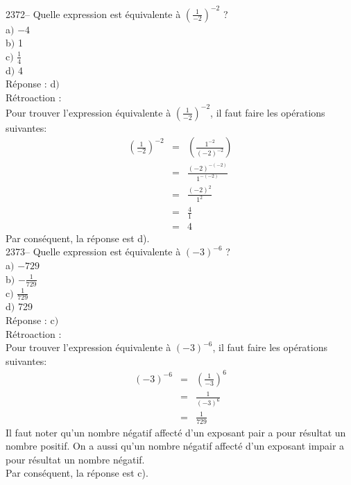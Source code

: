 \documentclass[letterpaper, 12pt]{article}
\begin{document}
2372-- Quelle expression est \'equivalente \`a $\left( \frac{1}{-2}\right)^{-2}$ ?\\

a$)$  $-4$\\
b$)$  1\\[2mm]
c$)$  $\frac{1}{4}$\\[2mm]
d$)$  4\\

R\'eponse : d$)$ \\

R\'etroaction :\\
Pour trouver l'expression \'equivalente \`a $\left( \frac{1}{-2}\right)^{-2}$, il faut faire les op\'erations suivantes:
\begin{eqnarray*}
 \left( \frac{1}{-2}\right)^{-2}&=&\left( \frac{1^{-2}}{(-2)^{-2}}\right)\\[2mm]
&=& \frac{(-2)^{-(-2)}}{1^{-(-2)}}\\[2mm]
&=& \frac{(-2)^{2}}{1^{2}}\\[2mm]
&=& \frac{4}{1}\\[2mm]
&=&4
\end{eqnarray*}
Par cons\'equent, la r\'eponse est d).\\

2373--  Quelle expression est \'equivalente \`a $(-3)^{-6}$ ?\\

a$)$  $-729$\\
b$)$  $-\frac{1}{729}$\\[2mm]
c$)$  $\frac{1}{729}$\\[2mm]
d$)$  729\\

R\'eponse : c$)$ \\

R\'etroaction :\\
Pour trouver l'expression \'equivalente \`a $(-3)^{-6}$, il faut faire les op\'erations suivantes:
\begin{eqnarray*}
(-3)^{-6}&=&\left( \frac{1}{-3}\right)^{6}\\[2mm]
&=&\frac{1}{(-3)^{6}}\\[2mm]
&=&\frac{1}{729}
\end{eqnarray*}
Il faut noter qu'un nombre n\'egatif affect\'e d'un exposant pair a pour r\'esultat un nombre positif. On a aussi qu'un nombre n\'egatif affect\'e d'un exposant impair a pour r\'esultat un nombre n\'egatif.\\
Par cons\'equent, la r\'eponse est c).\\
\end{document}
